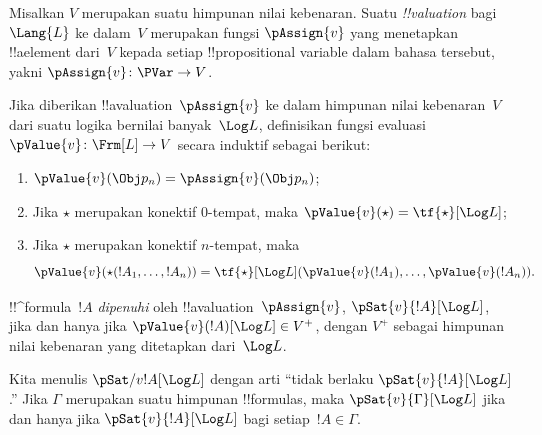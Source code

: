 \documentclass[../../../include/open-logic-section]{subfiles}
\begin{document}


\begin{defn}[!!^{valuation}s]
Misalkan $V$ merupakan suatu himpunan nilai kebenaran. Suatu
\emph{!!{valuation}} bagi~$\Lang{L}$ ke dalam~$V$ merupakan fungsi
$\pAssign{v}$ yang menetapkan !!a{element} dari~$V$ kepada setiap
!!{propositional variable} dalam bahasa tersebut, yakni
$\pAssign{v}\colon\PVar\to V$.
\end{defn}

\begin{defn}
  Jika diberikan !!a{valuation}~$\pAssign{v}$ ke dalam himpunan nilai
  kebenaran~$V$ dari suatu logika bernilai banyak~$\Log L$, definisikan fungsi
  evaluasi $\pValue{v}\colon\Frm[L]\to V$ secara induktif sebagai berikut:
  \begin{enumerate}
    \item $\pValue{v}(\Obj p_n)=\pAssign{v}(\Obj p_n)$;
    \item Jika $\star$ merupakan konektif $0$-tempat, maka
    $\pValue{v}(\star)=\tf{\star}[\Log L]$;
    \item Jika $\star$ merupakan konektif $n$-tempat, maka
    \[
      \pValue{v}(\star(!A_1,\dots,!A_n))=\tf{\star}[\Log L]
      (\pValue{v}(!A_1),\dots,\pValue{v}(!A_n)).
    \]
  \end{enumerate}
\end{defn}

\begin{defn}[Keterpenuhan]
 !!^{formula}~$!A$ \emph{dipenuhi} oleh
  !!a{valuation}~$\pAssign{v}$, $\pSat{v}{!A}[\Log L]$, jika dan hanya jika
  $\pValue{v}(!A)[\Log L]\in V^+$, dengan $V^+$ sebagai himpunan nilai
  kebenaran yang ditetapkan dari~$\Log L$.

  Kita menulis $\pSat/{v}{!A}[\Log L]$ dengan arti ``tidak berlaku
  $\pSat{v}{!A}[\Log L]$.'' Jika $\Gamma$ merupakan suatu himpunan
  !!{formula}s, maka $\pSat{v}{\Gamma}[\Log L]$ jika dan hanya jika
  $\pSat{v}{!A}[\Log L]$ bagi setiap~$!A\in\Gamma$.
\end{defn}
\end{document}
